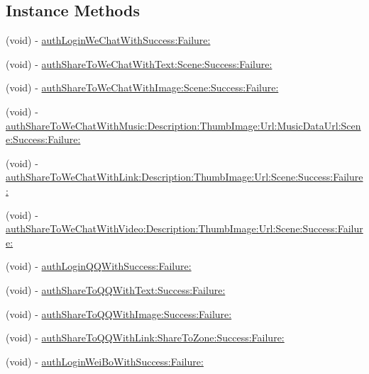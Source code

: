 \subsection*{Instance Methods}
\begin{DoxyCompactItemize}
\item 
(void) -\/ \mbox{\hyperlink{interface_b_q_l_auth_engine_a48b93722b4fdedf032b34edc95643790}{auth\+Login\+We\+Chat\+With\+Success\+:\+Failure\+:}}
\item 
(void) -\/ \mbox{\hyperlink{interface_b_q_l_auth_engine_a91518c73400f938247fa7eddee187194}{auth\+Share\+To\+We\+Chat\+With\+Text\+:\+Scene\+:\+Success\+:\+Failure\+:}}
\item 
(void) -\/ \mbox{\hyperlink{interface_b_q_l_auth_engine_a61b691cc600e9689afd9a965e3cff84a}{auth\+Share\+To\+We\+Chat\+With\+Image\+:\+Scene\+:\+Success\+:\+Failure\+:}}
\item 
(void) -\/ \mbox{\hyperlink{interface_b_q_l_auth_engine_a7f4c9ec95e5493515e3443c802cd6c88}{auth\+Share\+To\+We\+Chat\+With\+Music\+:\+Description\+:\+Thumb\+Image\+:\+Url\+:\+Music\+Data\+Url\+:\+Scene\+:\+Success\+:\+Failure\+:}}
\item 
(void) -\/ \mbox{\hyperlink{interface_b_q_l_auth_engine_aa870ee7e76ebfdc4f4085ca7d4a60aef}{auth\+Share\+To\+We\+Chat\+With\+Link\+:\+Description\+:\+Thumb\+Image\+:\+Url\+:\+Scene\+:\+Success\+:\+Failure\+:}}
\item 
(void) -\/ \mbox{\hyperlink{interface_b_q_l_auth_engine_a38f612dc8f9a6dccbb8bd88258611e35}{auth\+Share\+To\+We\+Chat\+With\+Video\+:\+Description\+:\+Thumb\+Image\+:\+Url\+:\+Scene\+:\+Success\+:\+Failure\+:}}
\item 
(void) -\/ \mbox{\hyperlink{interface_b_q_l_auth_engine_ad00b02888295e09ea4bc1c764aea1e8f}{auth\+Login\+Q\+Q\+With\+Success\+:\+Failure\+:}}
\item 
(void) -\/ \mbox{\hyperlink{interface_b_q_l_auth_engine_a2659b2b8ffd6cecbb39d523bfc401b5f}{auth\+Share\+To\+Q\+Q\+With\+Text\+:\+Success\+:\+Failure\+:}}
\item 
(void) -\/ \mbox{\hyperlink{interface_b_q_l_auth_engine_a5059fb2c57270d5dc2ada800ab69e22a}{auth\+Share\+To\+Q\+Q\+With\+Image\+:\+Success\+:\+Failure\+:}}
\item 
(void) -\/ \mbox{\hyperlink{interface_b_q_l_auth_engine_a888aaff595972f255b8d0b0eb8c86424}{auth\+Share\+To\+Q\+Q\+With\+Link\+:\+Share\+To\+Zone\+:\+Success\+:\+Failure\+:}}
\item 
(void) -\/ \mbox{\hyperlink{interface_b_q_l_auth_engine_ae9a00b2bcc82ed659282621120821eda}{auth\+Login\+Wei\+Bo\+With\+Success\+:\+Failure\+:}}
\end{DoxyCompactItemize}
